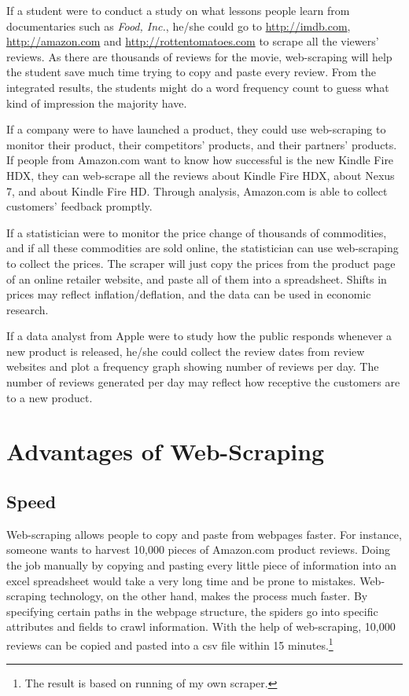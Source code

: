 \documentclass[12pt]{report}
\begin{document}
If a student were to conduct a study on what lessons people learn from documentaries such as \textit{Food, Inc.}, he/she could go to \url{http://imdb.com}, \url{http://amazon.com} and \url{http://rottentomatoes.com} to scrape all the viewers' reviews. As there are thousands of reviews for the movie, web-scraping will help the student save much time trying to copy and paste every review. From the integrated results, the students might do a word frequency count to guess what kind of impression the majority have.

If a company were to have launched a product, they could use web-scraping to monitor their product, their competitors' products, and their partners' products. If people from Amazon.com  want to know how successful is the new Kindle Fire HDX, they can web-scrape all the reviews about Kindle Fire HDX, about Nexus 7, and about Kindle Fire HD. Through analysis, Amazon.com is able to collect customers' feedback promptly.

If a statistician were to monitor the price change of thousands of commodities, and if all these commodities are sold online, the statistician can use web-scraping to collect the prices. The scraper will just copy the prices from the product page of an online retailer website, and paste all of them into a spreadsheet. Shifts  in prices may reflect inflation/deflation, and the data can be used in economic research.

If a data analyst from Apple were to study how the public responds whenever a new product is released, he/she could collect the review dates from review websites and plot a frequency graph showing number of reviews per day. The number of reviews generated per day may reflect how receptive the customers are to a new product.

\section{Advantages of Web-Scraping}

\subsection{Speed}

Web-scraping allows people to copy and paste from webpages faster. For instance, someone wants to harvest 10,000 pieces of Amazon.com product reviews. Doing the job manually by copying and pasting every little piece of information into an excel spreadsheet would take a very long time and be prone to mistakes. Web-scraping technology, on the other hand, makes the process much faster. By specifying certain paths in the webpage structure, the spiders go into specific attributes and fields to \gls{crawl} information. With the help of web-scraping, 10,000 reviews can be copied and pasted into a \gls{csv} file within 15 minutes.\footnote{The result is based on running of my own scraper.}
\end{document}
